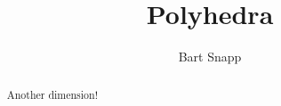 \documentclass[handout,nooutcomes,noauthor]{ximera}
\title{Polyhedra}
\author{Bart Snapp}
\begin{document}
\begin{abstract}
Another dimension!
\end{abstract}
\maketitle


\begin{listSectionOutcomes}
\item 
\end{listSectionOutcomes}
\end{document}
